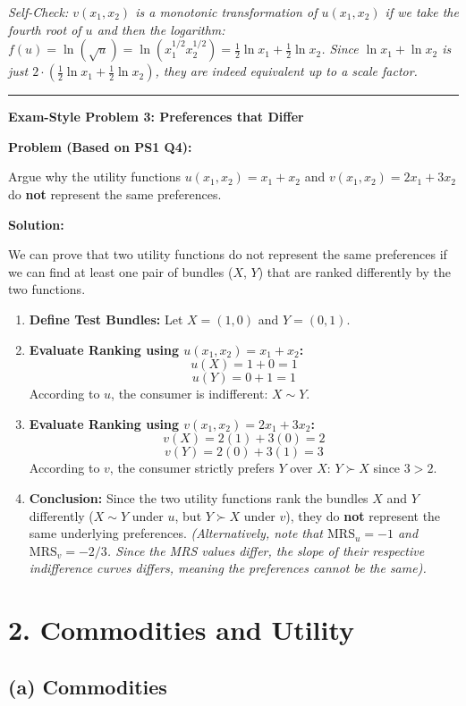 \documentclass{article}
\begin{document}
\textit{Self-Check: $v(x_1, x_2)$ is a monotonic transformation of $u(x_1, x_2)$ if we take the fourth root of $u$ and then the logarithm: $f(u) = \ln(\sqrt{u}) = \ln(x_1^{1/2} x_2^{1/2}) = \frac{1}{2}\ln x_1 + \frac{1}{2}\ln x_2$. Since $\ln x_1 + \ln x_2$ is just $2 \cdot (\frac{1}{2}\ln x_1 + \frac{1}{2}\ln x_2)$, they are indeed equivalent up to a scale factor.}

\noindent\rule{\linewidth}{0.4pt}

\noindent\textbf{Exam-Style Problem 3: Preferences that Differ}

\textbf{Problem (Based on PS1 Q4):}

Argue why the utility functions $u(x_1, x_2) = x_1 + x_2$ and $v(x_1, x_2) = 2x_1 + 3x_2$ do \textbf{not} represent the same preferences.

\textbf{Solution:}

We can prove that two utility functions do not represent the same preferences if we can find at least one pair of bundles ($X$, $Y$) that are ranked differently by the two functions.

\begin{enumerate}
    \item \textbf{Define Test Bundles:} Let $X = (1, 0)$ and $Y = (0, 1)$.
    \item \textbf{Evaluate Ranking using $u(x_1, x_2) = x_1 + x_2$:} \[u(X) = 1 + 0 = 1\] \[u(Y) = 0 + 1 = 1\] According to $u$, the consumer is indifferent: $X \sim Y$.
    \item \textbf{Evaluate Ranking using $v(x_1, x_2) = 2x_1 + 3x_2$:} \[v(X) = 2(1) + 3(0) = 2\] \[v(Y) = 2(0) + 3(1) = 3\] According to $v$, the consumer strictly prefers $Y$ over $X$: $Y \succ X$ since $3 > 2$.
    \item \textbf{Conclusion:} Since the two utility functions rank the bundles $X$ and $Y$ differently ($X \sim Y$ under $u$, but $Y \succ X$ under $v$), they do \textbf{not} represent the same underlying preferences. \textit{(Alternatively, note that $\text{MRS}_u = -1$ and $\text{MRS}_v = -2/3$. Since the MRS values differ, the slope of their respective indifference curves differs, meaning the preferences cannot be the same).}
\end{enumerate}

\section{2. Commodities and Utility}
\subsection{(a) Commodities}
\end{document}

